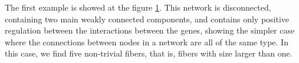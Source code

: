 \documentclass[12pt]{diazessay} %
\begin{document}
The first example is showed at the figure \ref{fig:result1}. This network is disconnected, containing two main weakly connected components, and contains only positive regulation between the interactions between the genes, showing the simpler case where the connections between nodes in a network are all of the same type. In this case, we find five non-trivial fibers, that is, fibers with size larger than one.

\begin{figure}[h]
	\centering
	\qquad
	\caption{}
	\label{fig:result1}
\end{figure}
\end{document}
